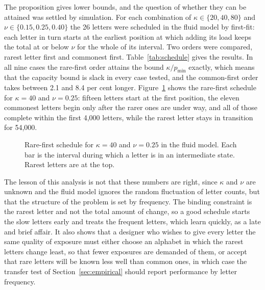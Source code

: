 The proposition gives lower bounds, and the question of whether they can be attained was settled by simulation. For each combination of $\kappa\in\{20,40,80\}$ and $\nu\in\{0.15,0.25,0.40\}$ the 26 letters were scheduled in the fluid model by first-fit: each letter in turn starts at the earliest position at which adding its load keeps the total at or below $\nu$ for the whole of its interval. Two orders were compared, rarest letter first and commonest first. Table~\ref{tab:schedule} gives the results. In all nine cases the rare-first order attains the bound $\kappa/p_{\min}$ exactly, which means that the capacity bound is slack in every case tested, and the common-first order takes between 2.1 and 8.4 per cent longer. Figure~\ref{fig:gantt} shows the rare-first schedule for $\kappa=40$ and $\nu=0.25$: fifteen letters start at the first position, the eleven commonest letters begin only after the rarer ones are under way, and all of those complete within the first 4{,}000 letters, while the rarest letter stays in transition for 54{,}000.

\begin{table}[ht]
\centering
\small

\caption{Length of book, in letters, needed to complete all 26 transitions in the fluid model. $\kappa$ is the number of exposures a letter spends in an intermediate state, $\nu$ the cap on the novelty load. Lower bounds are from Proposition~\ref{prop:conservation}.}\label{tab:schedule}
\end{table}

\begin{figure}[ht]
\centering

\caption{Rare-first schedule for $\kappa=40$ and $\nu=0.25$ in the fluid model. Each bar is the interval during which a letter is in an intermediate state. Rarest letters are at the top.}\label{fig:gantt}
\end{figure}

The lesson of this analysis is not that these numbers are right, since $\kappa$ and $\nu$ are unknown and the fluid model ignores the random fluctuation of letter counts, but that the structure of the problem is set by frequency. The binding constraint is the rarest letter and not the total amount of change, so a good schedule starts the slow letters early and treats the frequent letters, which learn quickly, as a late and brief affair. It also shows that a designer who wishes to give every letter the same quality of exposure must either choose an alphabet in which the rarest letters change least, so that fewer exposures are demanded of them, or accept that rare letters will be known less well than common ones, in which case the transfer test of Section~\ref{sec:empirical} should report performance by letter frequency.

